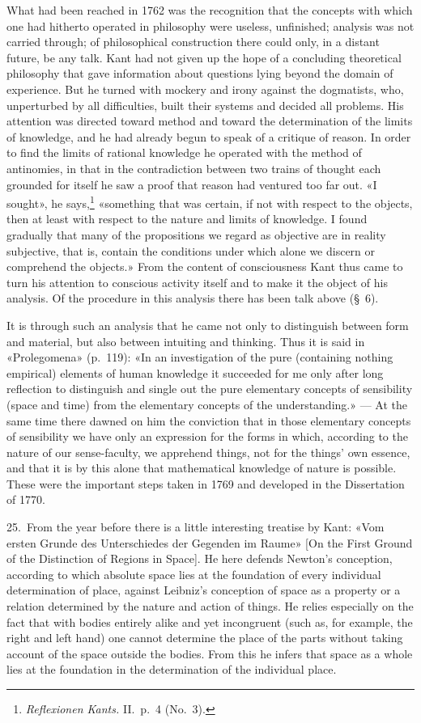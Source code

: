 \documentclass[12pt,a4paper]{article}
\newcommand{\opage}[1]{\marginnote{\footnotesize\textit{[#1]}}}
\begin{document}
What had been reached in 1762 was the recognition that the concepts with
which one had hitherto operated in philosophy were useless, unfinished;
analysis was not carried through; of philosophical construction there could
only, in a distant future, be any talk. Kant had not given up the hope of a
concluding theoretical philosophy that gave information about questions
lying beyond the domain of experience. But he turned with mockery and irony
against the dogmatists, who, unperturbed by all difficulties, built their
systems and decided all problems. His attention was directed toward method
and toward the determination of the limits of knowledge, and he had already
begun to speak of a critique of reason. In order to find the limits of
rational knowledge he operated with the method of antinomies, in that in
the contradiction between two trains of thought each grounded for itself he
saw a proof that reason had ventured too far out. «I sought», he
says,\footnote{\textit{Reflexionen Kants.} II.\ p.\ 4 (No.\ 3).}
«something that was certain, if not with respect to the objects, then at
least with respect to the nature and limits of knowledge. I found
gradually that many of the propositions we regard as objective are in
reality subjective, that is, contain the conditions under which alone we
discern or comprehend the objects.» From the content of consciousness Kant
thus came to turn his attention to conscious activity itself and to make it
the object of his analysis. Of the procedure in this analysis there has
been talk above (§\ 6).

It is through such an analysis that he came not only to distinguish between
form and material, but also between intuiting and thinking. Thus it is said
in «Prolegomena» (p.\ 119): «In an investigation of the pure (containing
nothing empirical) elements of human knowledge it succeeded for me only
after long reflection to distinguish and single out the pure elementary
concepts of sensibility (space and time) from the elementary concepts of
the understanding.» --- At the same time there dawned on him the conviction
that in those elementary concepts of sensibility we have only an expression
for the forms in which, according to the nature of our sense-faculty, we
apprehend things, not for the things' own essence, and that it is by this
alone that mathematical knowledge of nature is possible. These were the
important steps taken in 1769 and developed in the Dissertation of 1770.

25.\ From the year before there is a little interesting treatise by Kant:
«Vom ersten \opage{48}Grunde des Unterschiedes der Gegenden im Raume» [On the First
Ground of the Distinction of Regions in Space]. He here defends Newton's
conception, according to which absolute space lies at the foundation of
every individual determination of place, against Leibniz's conception of
space as a property or a relation determined by the nature and action of
things. He relies especially on the fact that with bodies entirely alike
and yet incongruent (such as, for example, the right and left hand) one
cannot determine the place of the parts without taking account of the space
outside the bodies. From this he infers that space as a whole lies at the
foundation in the determination of the individual place.
\end{document}
